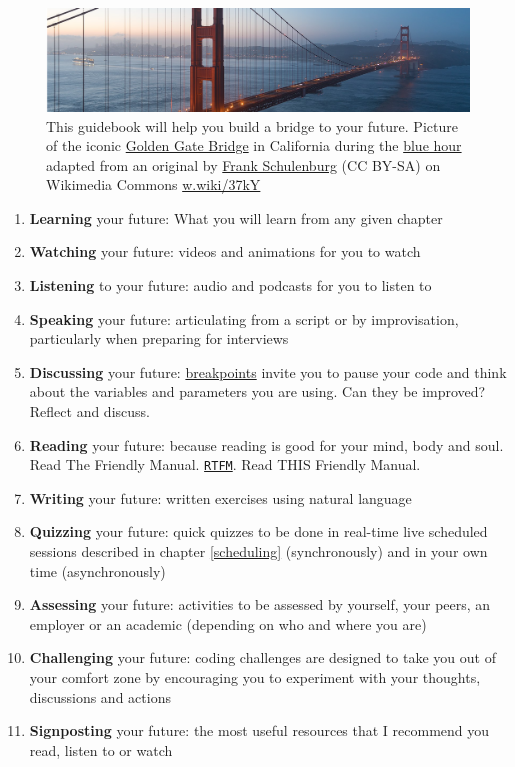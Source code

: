 \documentclass[
]{book}
\providecommand{\tightlist}{%
  \setlength{\itemsep}{0pt}\setlength{\parskip}{0pt}}
\begin{document}
\begin{figure}

{\centering \includegraphics[width=1\linewidth]{images/goldengate} 

}

\caption{This guidebook will help you build a bridge to your future. Picture of the iconic \href{https://en.wikipedia.org/wiki/Golden_Gate_Bridge}{Golden Gate Bridge} in California during the \href{https://en.wikipedia.org/wiki/Blue_hour}{blue hour} adapted from an original by \href{https://commons.wikimedia.org/wiki/User:Frank_Schulenburg}{Frank Schulenburg} (CC BY-SA) on Wikimedia Commons \href{https://w.wiki/37kY}{w.wiki/37kY}}\label{fig:goldengate-fig}
\end{figure}



\begin{enumerate}
\def\labelenumi{\arabic{enumi}.}
\tightlist
\item
  \textbf{Learning} your future: What you will learn from any given chapter
\item
  \textbf{Watching} your future: videos and animations for you to watch
\item
  \textbf{Listening} to your future: audio and podcasts for you to listen to
\item
  \textbf{Speaking} your future: articulating from a script or by improvisation, particularly when preparing for interviews
\item
  \textbf{Discussing} your future: \href{https://en.wikipedia.org/wiki/Breakpoint}{breakpoints} invite you to pause your code and think about the variables and parameters you are using. Can they be improved? Reflect and discuss.
\item
  \textbf{Reading} your future: because reading is good for your mind, body and soul. Read The Friendly Manual. \href{https://en.wikipedia.org/wiki/RTFM}{\texttt{RTFM}}. Read THIS Friendly Manual.
\item
  \textbf{Writing} your future: written exercises using natural language
\item
  \textbf{Quizzing} your future: quick quizzes to be done in real-time live scheduled sessions described in chapter \ref{scheduling} (synchronously) and in your own time (asynchronously)
\item
  \textbf{Assessing} your future: activities to be assessed by yourself, your peers, an employer or an academic (depending on who and where you are)
\item
  \textbf{Challenging} your future: coding challenges are designed to take you out of your comfort zone by encouraging you to experiment with your thoughts, discussions and actions
\item
  \textbf{Signposting} your future: the most useful resources that I recommend you read, listen to or watch
\end{enumerate}
\end{document}
